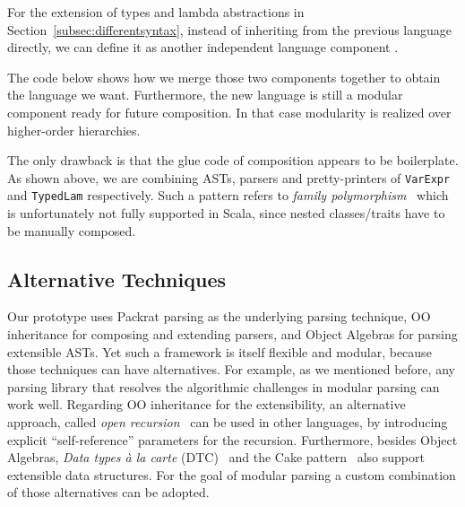 For the extension of types and lambda abstractions in Section~\ref{subsec:differentsyntax}, instead of inheriting from the previous language directly, we can define it as another independent language component .

\vspace{-4pt}
\vspace{-4pt}

The code below shows how we merge those two components together to obtain the language we want. Furthermore, the new language is still a modular
component ready for future composition. In that case modularity is realized over higher-order hierarchies.

\vspace{-4pt}
\vspace{-4pt}

The only drawback is that the glue code of composition appears to be
boilerplate. As shown above, we are combining ASTs, parsers and
pretty-printers of \lstinline{VarExpr} and \lstinline{TypedLam}
respectively. Such a pattern refers to \textit{family
  polymorphism}~\cite{ernst01FP} which is unfortunately not fully supported
in Scala, since nested classes/traits have to be manually composed.

\subsection{Alternative Techniques}

Our prototype uses Packrat parsing as the underlying parsing technique, OO inheritance for composing and extending parsers, and Object Algebras for parsing extensible ASTs. Yet such a framework is itself flexible and modular, because those techniques can have alternatives.
For example, as we mentioned before, any parsing library
that resolves the algorithmic challenges in modular parsing can work well. Regarding OO inheritance for the extensibility, an alternative approach, called \textit{open recursion}~\cite{CookThesis} can be used in other languages, by introducing explicit ``self-reference'' parameters for the recursion. Furthermore, besides Object Algebras, \textit{Data types \`a la carte} (DTC)~\cite{swierstra2008data} and the Cake pattern~\cite{odersky2005independently} also support extensible data structures. For the goal of modular parsing a custom combination of those alternatives can be adopted.
